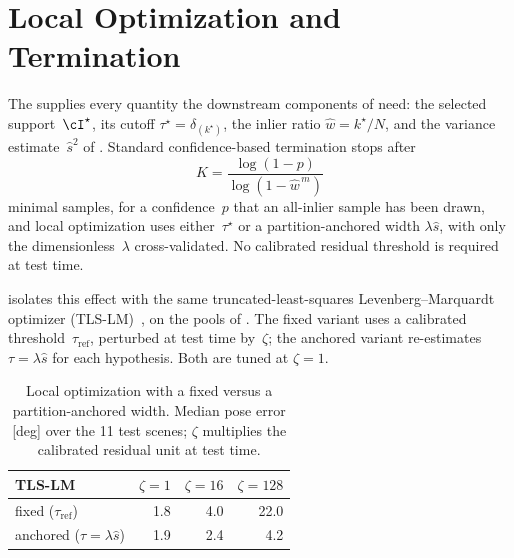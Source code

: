 \section{Local Optimization and Termination}
\label{sec:supp-deploy-lo}

The \sortsweep supplies every quantity the downstream components
of \ransac need: the selected support~$\cI^\star$, its cutoff
$\tau^\star = \delta_{(k^\star)}$, the inlier ratio $\hat w = k^\star/N$,
and the variance estimate~$\hat s^2$ of .
Standard confidence-based termination stops after
\begin{equation}
	K = \frac{\log(1-p)}{\log(1-\hat w^{\,m})}
\end{equation}
minimal samples, for a confidence~$p$ that an all-inlier sample has been
drawn, and local optimization uses either~$\tau^\star$ or a
partition-anchored width $\lambda\hat s$, with only the
dimensionless~$\lambda$ cross-validated.  No calibrated residual
threshold is required at test time.

 isolates this effect with the same \poselib
truncated-least-squares Levenberg--Marquardt optimizer (TLS-LM)~\cite{PoseLib},
on the \phototourism pools of .  The fixed
variant uses a calibrated threshold~$\tau_{\mathrm{ref}}$, perturbed
at test time by~$\zeta$; the anchored variant re-estimates
$\tau = \lambda\hat s$ for each hypothesis.  Both are tuned at
$\zeta = 1$.

\begin{table}[ht]
	\centering
	\caption{Local optimization with a fixed versus a partition-anchored
		width.  Median pose error [deg] over the 11 \phototourism test scenes; $\zeta$
		multiplies the calibrated residual unit at test time.}
	\label{tab:lo-anchor}
	\smallskip
	\begin{tabular}{lrrr}
		\toprule
		\poselib TLS-LM                                & $\zeta = 1$ & $\zeta = 16$ & $\zeta = 128$ \\ %
		\midrule
		fixed ($\tau_{\mathrm{ref}}$)                 & 1.8         & 4.0          & 22.0          \\
		anchored ($\tau = \lambda\hat s$)          & 1.9         & 2.4          & 4.2           \\
		\bottomrule
	\end{tabular}
\end{table}
